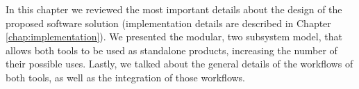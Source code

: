 
In this chapter we reviewed the most important details about the design of the
proposed software solution (implementation details are described in Chapter
\ref{chap:implementation}). We presented the modular, two subsystem model, that
allows both tools to be used as standalone products, increasing the number of
their possible uses. Lastly, we talked about the general details of the
workflows of both tools, as well as the integration of those workflows.
